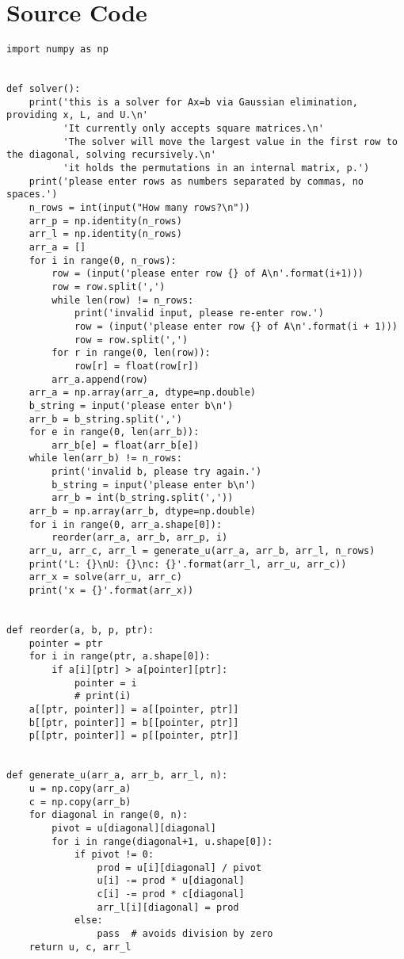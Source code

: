 \documentclass{article}
\begin{document}
\section {Source Code}
\begin{verbatim}
import numpy as np


def solver():
    print('this is a solver for Ax=b via Gaussian elimination, providing x, L, and U.\n'
          'It currently only accepts square matrices.\n'
          'The solver will move the largest value in the first row to the diagonal, solving recursively.\n'
          'it holds the permutations in an internal matrix, p.')
    print('please enter rows as numbers separated by commas, no spaces.')
    n_rows = int(input("How many rows?\n"))
    arr_p = np.identity(n_rows)
    arr_l = np.identity(n_rows)
    arr_a = []
    for i in range(0, n_rows):
        row = (input('please enter row {} of A\n'.format(i+1)))
        row = row.split(',')
        while len(row) != n_rows:
            print('invalid input, please re-enter row.')
            row = (input('please enter row {} of A\n'.format(i + 1)))
            row = row.split(',')
        for r in range(0, len(row)):
            row[r] = float(row[r])
        arr_a.append(row)
    arr_a = np.array(arr_a, dtype=np.double)
    b_string = input('please enter b\n')
    arr_b = b_string.split(',')
    for e in range(0, len(arr_b)):
        arr_b[e] = float(arr_b[e])
    while len(arr_b) != n_rows:
        print('invalid b, please try again.')
        b_string = input('please enter b\n')
        arr_b = int(b_string.split(','))
    arr_b = np.array(arr_b, dtype=np.double)
    for i in range(0, arr_a.shape[0]):
        reorder(arr_a, arr_b, arr_p, i)
    arr_u, arr_c, arr_l = generate_u(arr_a, arr_b, arr_l, n_rows)
    print('L: {}\nU: {}\nc: {}'.format(arr_l, arr_u, arr_c))
    arr_x = solve(arr_u, arr_c)
    print('x = {}'.format(arr_x))


def reorder(a, b, p, ptr):
    pointer = ptr
    for i in range(ptr, a.shape[0]):
        if a[i][ptr] > a[pointer][ptr]:
            pointer = i
            # print(i)
    a[[ptr, pointer]] = a[[pointer, ptr]]
    b[[ptr, pointer]] = b[[pointer, ptr]]
    p[[ptr, pointer]] = p[[pointer, ptr]]


def generate_u(arr_a, arr_b, arr_l, n):
    u = np.copy(arr_a)
    c = np.copy(arr_b)
    for diagonal in range(0, n):
        pivot = u[diagonal][diagonal]
        for i in range(diagonal+1, u.shape[0]):
            if pivot != 0:
                prod = u[i][diagonal] / pivot
                u[i] -= prod * u[diagonal]
                c[i] -= prod * c[diagonal]
                arr_l[i][diagonal] = prod
            else:
                pass  # avoids division by zero
    return u, c, arr_l



\end{verbatim}
\end{document}
